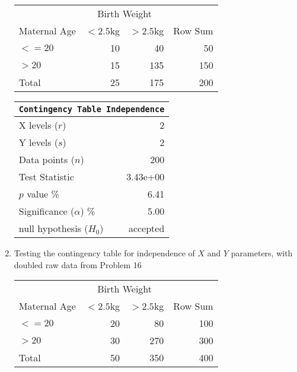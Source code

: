 \begin{enumerate}
	\begin{table}[H]
		\centering
		\begin{tabular}{lrrr}
			\toprule
			{} & \multicolumn{2}{c}{Birth Weight} & {} \\
			Maternal Age &   $ <2.5 $kg &   $ >2.5 $kg &  Row Sum \\
			\midrule
			$ <= 20 $        &                    10 &                    40 &       50 \\
			$ > 20 $         &                    15 &                   135 &      150 \\
			\midrule
			Total        &                    25 &                   175 &      200 \\
			\bottomrule
		\end{tabular}
		
	\end{table}
	\bigskip
	\begin{table}[H]
		\centering
		\begin{tabular}{@{}lr@{}}
			\toprule
			\multicolumn{2}{c}{\texttt{Contingency Table Independence}} \\
			\midrule
			X levels ($r$)             &         2 \\
			Y levels ($s$)             &         2 \\
			Data points ($n$)          &       200 \\
			Test Statistic             &  3.43e+00 \\
			$p$ value \%               &      6.41 \\
			Significance ($\alpha$) \% &      5.00 \\
			null hypothesis ($H_0$)    &  accepted \\
			\bottomrule
		\end{tabular}
		
	\end{table}
	\bigskip
	
	\item Testing the contingency table for independence of $ X $ and $ Y $ parameters, with doubled raw data from Problem 16\\
	
	\begin{table}[H]
		\centering
		\begin{tabular}{lrrr}
			\toprule
			{} & \multicolumn{2}{c}{Birth Weight} & {} \\
			{Maternal Age} &   $ <2.5 $kg &   $ >2.5 $kg &  Row Sum \\
			\midrule
			$ <= 20 $        &                    20 &                    80 &       100 \\
			$ > 20 $         &                    30 &                   270 &      300 \\
			\midrule
			Total        &                    50 &                   350 &      400 \\
			\bottomrule
		\end{tabular}
		

\end{table}
\end{enumerate}
